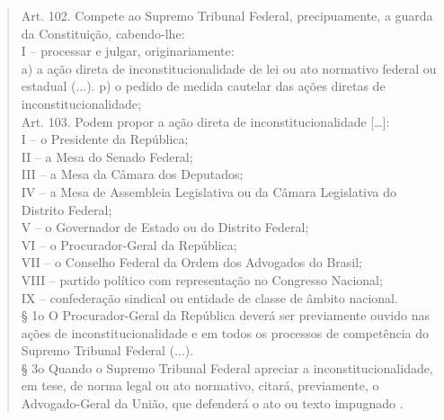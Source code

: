 \documentclass{article}
\begin{document}
\begin{quote}
    Art. 102. Compete ao Supremo Tribunal Federal, precipuamente, a guarda da Constituição, cabendo-lhe:\\
    I – processar e julgar, originariamente:\\
    a) a ação direta de inconstitucionalidade de lei ou ato normativo federal ou estadual (...).
    p) o pedido de medida cautelar das ações diretas de inconstitucionalidade;\\
    Art. 103. Podem propor a ação direta de inconstitucionalidade […]:\\
    I – o Presidente da República;\\
    II – a Mesa do Senado Federal;\\
    III – a Mesa da Câmara dos Deputados;\\
    IV – a Mesa de Assembleia Legislativa ou da Câmara Legislativa do Distrito Federal;\\
    V – o Governador de Estado ou do Distrito Federal;\\
    VI – o Procurador-Geral da República;\\
    VII – o Conselho Federal da Ordem dos Advogados do Brasil;\\
    VIII – partido político com representação no Congresso Nacional;\\
    IX – confederação sindical ou entidade de classe de âmbito nacional.\\
    § 1o O Procurador-Geral da República deverá ser previamente ouvido nas ações de inconstitucionalidade e em todos os processos de competência do Supremo Tribunal Federal (...).\\
    § 3o Quando o Supremo Tribunal Federal apreciar a inconstitucionalidade, em tese, de norma legal ou ato normativo, citará, previamente, o Advogado-Geral da União, que defenderá o ato ou texto impugnado \cite{brasil_constituicao_1988}.
\end{quote}
\end{document}
